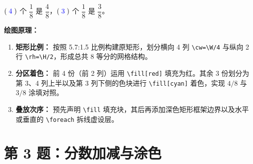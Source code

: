 \vspace{0.5cm}
\begin{center}

\vspace{0.4cm}
{\Large $(\;\textcolor{blue}{4}\;)$ 个 $\dfrac{1}{8}$ 是 $\dfrac{4}{8}$，$(\;\textcolor{blue}{3}\;)$ 个 $\dfrac{1}{8}$ 是 $\dfrac{3}{8}$。}
\end{center}

\vspace{0.5cm}
\textbf{绘图原理：}
\begin{enumerate}
    \item \textbf{矩形比例：} 按照 5.7:1.5 比例构建原矩形，划分横向 4 列 \texttt{\textbackslash cw=\textbackslash W/4} 与纵向 2 行 \texttt{\textbackslash rh=\textbackslash H/2}，形成总共 8 等分的网格结构。
    \item \textbf{分区着色：} 前 4 份（前 2 列）运用 \texttt{\textbackslash fill[red]} 填充为红。其余 3 份划分为第 3、4 列上半以及第 3 列下侧的色块进行 \texttt{\textbackslash fill[cyan]} 着色，实现 $4/8$ 与 $3/8$ 涂填对照。
    \item \textbf{叠放次序：} 预先声明 \texttt{\textbackslash fill} 填充块，其后再添加深色矩形框架边界以及水平或垂直的 \texttt{\textbackslash foreach} 拆线虚设层。
\end{enumerate}

\vspace{1.5cm}

\section*{第 3 题：分数加减与涂色}

